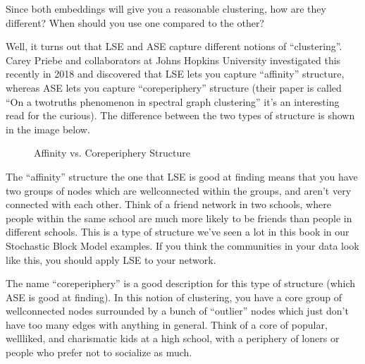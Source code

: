 \documentclass[letterpaper,10pt,english]{jupyterBook}
\let\sphinxpxdimen\pdfpxdimen\else\newdimen\sphinxpxdimen
\begin{document}
\sphinxAtStartPar
Since both embeddings will give you a reasonable clustering, how are they different? When should you use one compared to the other?

\sphinxAtStartPar
Well, it turns out that LSE and ASE capture different notions of “clustering”. Carey Priebe and collaborators at Johns Hopkins University investigated this recently \sphinxhyphen{} in 2018 \sphinxhyphen{} and discovered that LSE lets you capture “affinity” structure, whereas ASE lets you capture “core\sphinxhyphen{}periphery” structure (their paper is called “On a two\sphinxhyphen{}truths phenomenon in spectral graph clustering” \sphinxhyphen{} it’s an interesting read for the curious). The difference between the two types of structure is shown in the image below.

\begin{figure}[htbp]
\centering
\capstart

\noindent\sphinxincludegraphics[height=400\sphinxpxdimen]{{two-truths}.jpeg}
\caption{Affinity vs. Core\sphinxhyphen{}periphery Structure}\label{\detokenize{representations/ch6/spectral-embedding:two-truths}}\end{figure}

\sphinxAtStartPar
The “affinity” structure \sphinxhyphen{} the one that LSE is good at finding \sphinxhyphen{} means that you have two groups of nodes which are well\sphinxhyphen{}connected within the groups, and aren’t very connected with each other. Think of a friend network in two schools, where people within the same school are much more likely to be friends than people in different schools. This is a type of structure we’ve seen a lot in this book in our Stochastic Block Model examples. If you think the communities in your data look like this, you should apply LSE to your network.

\sphinxAtStartPar
The name “core\sphinxhyphen{}periphery” is a good description for this type of structure (which ASE is good at finding). In this notion of clustering, you have a core group of well\sphinxhyphen{}connected nodes surrounded by a bunch of “outlier” nodes which just don’t have too many edges with anything in general. Think of a core of popular, well\sphinxhyphen{}liked, and charismatic kids at a high school, with a periphery of loners or people who prefer not to socialize as much.
\end{document}
